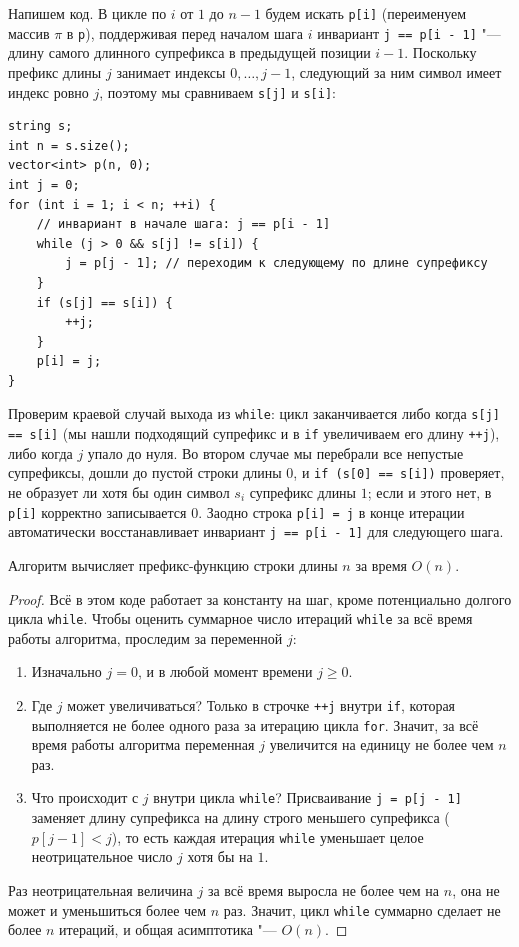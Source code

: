 Напишем код. В цикле по $i$ от $1$ до $n - 1$ будем искать \texttt{p[i]} (переименуем массив $\pi$ в \texttt{p}), поддерживая перед началом шага $i$ инвариант \texttt{j == p[i - 1]} "--- длину самого длинного супрефикса в предыдущей позиции $i - 1$. Поскольку префикс длины $j$ занимает индексы $0, \dots, j - 1$, следующий за ним символ имеет индекс ровно $j$, поэтому мы сравниваем \texttt{s[j]} и \texttt{s[i]}:

\begin{lstlisting}
string s;
int n = s.size();
vector<int> p(n, 0);
int j = 0;
for (int i = 1; i < n; ++i) {
    // инвариант в начале шага: j == p[i - 1]
    while (j > 0 && s[j] != s[i]) {
        j = p[j - 1]; // переходим к следующему по длине супрефиксу
    }
    if (s[j] == s[i]) {
        ++j;
    }
    p[i] = j;
}
\end{lstlisting}

Проверим краевой случай выхода из \texttt{while}: цикл заканчивается либо когда \texttt{s[j] == s[i]} (мы нашли подходящий супрефикс и в \texttt{if} увеличиваем его длину \texttt{++j}), либо когда $j$ упало до нуля. Во втором случае мы перебрали все непустые супрефиксы, дошли до пустой строки длины $0$, и \texttt{if (s[0] == s[i])} проверяет, не образует ли хотя бы один символ $s_i$ супрефикс длины $1$; если и этого нет, в \texttt{p[i]} корректно записывается $0$. Заодно строка \texttt{p[i] = j} в конце итерации автоматически восстанавливает инвариант \texttt{j == p[i - 1]} для следующего шага.

\begin{theorem}
    Алгоритм вычисляет префикс-функцию строки длины $n$ за время $O(n)$.
\end{theorem}

\begin{proof}
    Всё в этом коде работает за константу на шаг, кроме потенциально долгого цикла \texttt{while}. Чтобы оценить суммарное число итераций \texttt{while} за всё время работы алгоритма, проследим за переменной $j$:
    \begin{enumerate}
        \item Изначально $j = 0$, и в любой момент времени $j \ge 0$.
        \item Где $j$ может увеличиваться? Только в строчке \texttt{++j} внутри \texttt{if}, которая выполняется не более одного раза за итерацию цикла \texttt{for}. Значит, за всё время работы алгоритма переменная $j$ увеличится на единицу не более чем $n$ раз.
        \item Что происходит с $j$ внутри цикла \texttt{while}? Присваивание \texttt{j = p[j - 1]} заменяет длину супрефикса на длину строго меньшего супрефикса ($p[j - 1] < j$), то есть каждая итерация \texttt{while} уменьшает целое неотрицательное число $j$ хотя бы на $1$.
    \end{enumerate}
    Раз неотрицательная величина $j$ за всё время выросла не более чем на $n$, она не может и уменьшиться более чем $n$ раз. Значит, цикл \texttt{while} суммарно сделает не более $n$ итераций, и общая асимптотика "--- $O(n)$.
\end{proof}

